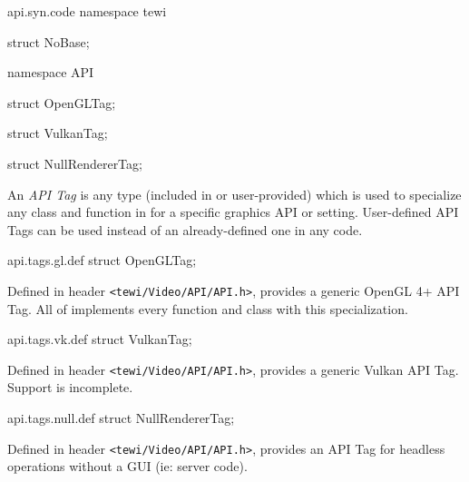 

\begin{tewicode}{api.syn.code}
namespace tewi
{
    struct NoBase;

    namespace API
    {
        struct OpenGLTag;

        struct VulkanTag;

        struct NullRendererTag;
    }
}

\end{tewicode}


An \textit{API Tag} is any type (included in \tewi{} or user-provided) which
is used to specialize any class and function in  for a specific
graphics API or setting.
User-defined API Tags can be used instead of an already-defined one in any code.


\begin{tewicode}{api.tags.gl.def}
struct OpenGLTag;
\end{tewicode}

Defined in header \texttt{<tewi/Video/API/API.h>}, provides a generic OpenGL 4+
API Tag. All of \tewi{} implements every function and class with this
specialization.


\begin{tewicode}{api.tags.vk.def}
struct VulkanTag;
\end{tewicode}

Defined in header \texttt{<tewi/Video/API/API.h>}, provides a generic Vulkan API
Tag. Support is incomplete.


\begin{tewicode}{api.tags.null.def}
struct NullRendererTag;
\end{tewicode}

Defined in header \texttt{<tewi/Video/API/API.h>}, provides an API Tag for
headless operations without a GUI (ie: server code).
